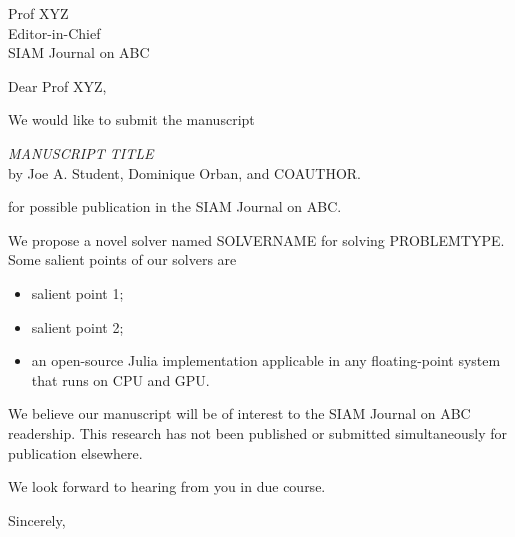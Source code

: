 \documentclass[letter,10pt]{letter}
\newcommand{\authorname}{Joe A. Student}
\newcommand{\eictitle}{Prof}
\newcommand{\eicname}{XYZ}  %
\newcommand{\journalname}{SIAM Journal on ABC}
\begin{document}
\begin{letter}{%
    \eictitle{} \eicname
    \\ Editor-in-Chief
    \\ \journalname
  }

  \opening{Dear \eictitle{} \eicname,}

  We would like to submit the manuscript
  \begin{center}
    {\it MANUSCRIPT TITLE}
    \\ by \authorname{}, Dominique Orban, and COAUTHOR.
  \end{center}
  for possible publication in the \journalname.

  We propose a novel solver named SOLVERNAME for solving PROBLEMTYPE.
  Some salient points of our solvers are

  \begin{itemize}
    \item salient point 1;
    \item salient point 2;
    \item an open-source Julia implementation applicable in any floating-point system that runs on CPU and GPU.
  \end{itemize}

  We believe our manuscript will be of interest to the \journalname{} readership.
  This research has not been published or submitted simultaneously for publication elsewhere.

  We look forward to hearing from you in due course.

  \closing{Sincerely,}
\end{letter}
\end{document}
